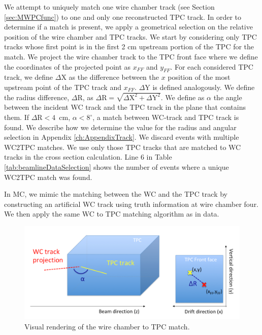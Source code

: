 We attempt to uniquely match one wire chamber track (see Section \ref{sec:MWPCfunc}) to one and only one reconstructed TPC track. 
In order to determine if a match is present, we apply a geometrical selection on the relative position of the wire chamber and TPC tracks. 
We start by considering only TPC tracks whose first point is in the first 2 cm upstream portion of the TPC for the match.  We project the wire chamber track to the TPC front face where we define the coordinates of the projected point as  $x_{FF}$ and $y_{FF}$.  For each considered TPC track, we define $\Delta$X as the difference between the $x$ position of the most upstream point of the TPC track and $x_{FF}$.  $\Delta$Y is defined analogously. We define the radius difference, $\Delta$R, as $ \Delta \text{R} =  \sqrt{ \Delta \text{X}^2 +  \Delta \text{Y}^2}  $. We define  as $\alpha$ the angle between the incident WC track and the TPC track in the plane that contains them.  If  $\Delta \text{R} < 4 $~cm, $\alpha < 8^\circ $,  a match between WC-track and TPC track is found. We describe  how we determine the value for the radius and angular selection in Appendix \ref{ch:AppendixTrack}.
We discard events with multiple WC2TPC matches. We use only those TPC tracks that are matched to WC tracks in the cross section calculation. Line 6 in Table \ref{tab:beamlineDataSelection} shows the number of events where a unique WC2TPC match was found.

In MC, we mimic the matching between the WC and the TPC track by constructing an artificial WC track using truth information at wire chamber four. We then apply the same WC to TPC matching algorithm as in data. 


\begin{figure}
  \centering  
\includegraphics[width=\textwidth]{Chapter-4/Images/WC2TPCMatchTracks.png}
\caption{Visual rendering of the wire chamber to TPC match.}
\label{fig:showerFilt}
\end{figure}

